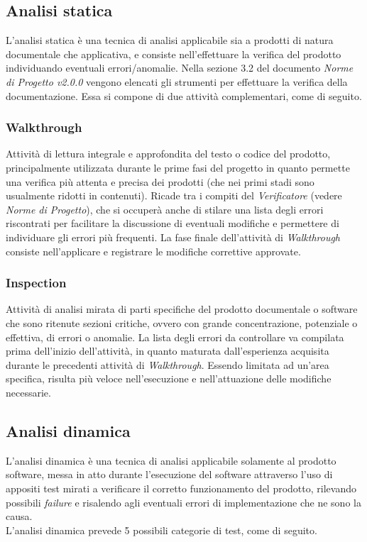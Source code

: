 
\subsection{Analisi statica}
L'analisi statica è una tecnica di analisi applicabile sia a prodotti di natura documentale che applicativa, e consiste nell'effettuare la verifica del prodotto individuando eventuali errori/anomalie. Nella sezione 3.2 del documento \emph{Norme di Progetto v2.0.0} vengono elencati gli strumenti per effettuare la verifica della documentazione. Essa si compone di due attività complementari, come di seguito.

\subsubsection{Walkthrough}
Attività di lettura integrale e approfondita del testo o codice del prodotto, principalmente utilizzata durante le prime fasi del progetto in quanto permette una verifica più attenta e precisa dei prodotti (che nei primi stadi sono usualmente ridotti in contenuti). Ricade tra i compiti del \emph{Verificatore} (vedere \emph{Norme di Progetto}), che si occuperà anche di stilare una lista degli errori riscontrati per facilitare la discussione di eventuali modifiche e permettere di individuare gli errori più frequenti. La fase finale dell'attività di \emph{Walkthrough} consiste nell'applicare e registrare le modifiche correttive approvate.

\subsubsection{Inspection}
Attività di analisi mirata di parti specifiche del prodotto documentale o software che sono ritenute sezioni critiche, ovvero con grande concentrazione, potenziale o effettiva, di errori o anomalie. La lista degli errori da controllare va compilata prima dell'inizio dell'attività, in quanto maturata dall'esperienza acquisita durante le precedenti attività di \emph{Walkthrough}. Essendo limitata ad un'area specifica, risulta più veloce nell'esecuzione e nell'attuazione delle modifiche necessarie.

\subsection{Analisi dinamica}
L'analisi dinamica è una tecnica di analisi applicabile solamente al prodotto software, messa in atto durante l'esecuzione del software attraverso l'uso di appositi test mirati a verificare il corretto funzionamento del prodotto, rilevando possibili \emph{failure} e risalendo agli eventuali errori di implementazione che ne sono la causa.\\
L'analisi dinamica prevede 5 possibili categorie di test, come di seguito. 

